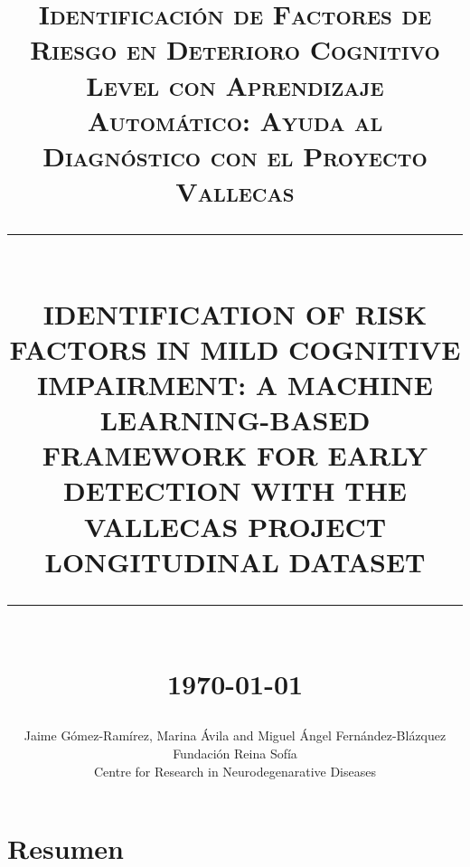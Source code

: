 \documentclass[11pt]{article}
\newcommand{\HRule}[1]{\rule{\linewidth}{#1}}
\begin{document}

\title{ \normalsize \textsc{Identificación de Factores de Riesgo en Deterioro Cognitivo Level con Aprendizaje Automático: Ayuda al Diagnóstico con el Proyecto Vallecas}
		\\ [2.0cm]
		\HRule{0.5pt} \\
		\LARGE \textbf{\uppercase{Identification of risk factors in Mild Cognitive Impairment: A Machine Learning-Based Framework for early detection with The Vallecas Project longitudinal dataset}}
		\HRule{2pt} \\ [0.5cm]
		\normalsize \today \vspace*{5\baselineskip}}

\date{}

\author{
		Jaime G\'omez-Ram\'irez, Marina \'Avila and Miguel \'Angel Fern\'andez-Bl\'azquez   \\
		Fundaci\'on Reina Sof\'ia \\
		Centre for Research in Neurodegenarative Diseases }

\maketitle
\tableofcontents
\newpage

\sectionfont{\scshape}


\section*{Resumen}
\end{document}
